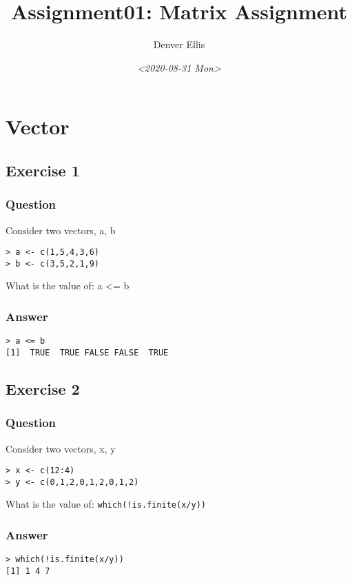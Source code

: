 \documentclass[11pt]{article}
\author{Denver Ellis}
\date{\textit{<2020-08-31 Mon>}}
\title{Assignment01: Matrix Assignment}
\begin{document}
\maketitle
\tableofcontents


\section{Vector}
\label{sec:org6771878}
\subsection{Exercise 1}
\label{sec:orgcf8f526}
\subsubsection{Question}
\label{sec:org5592d7b}
Consider two vectors, a, b

\begin{verbatim}
> a <- c(1,5,4,3,6)
> b <- c(3,5,2,1,9)
\end{verbatim}

What is the value of: a <= b

\subsubsection{Answer}
\label{sec:org85d8f69}
\begin{verbatim}
> a <= b
[1]  TRUE  TRUE FALSE FALSE  TRUE
\end{verbatim}

\subsection{Exercise 2}
\label{sec:org54b8fd1}
\subsubsection{Question}
\label{sec:orgf08ae05}
Consider two vectors, x, y

\begin{verbatim}
> x <- c(12:4)
> y <- c(0,1,2,0,1,2,0,1,2)
\end{verbatim}

What is the value of: \texttt{which(!is.finite(x/y))}

\subsubsection{Answer}
\label{sec:orge55e521}
\begin{verbatim}
> which(!is.finite(x/y))
[1] 1 4 7
\end{verbatim}
\end{document}
